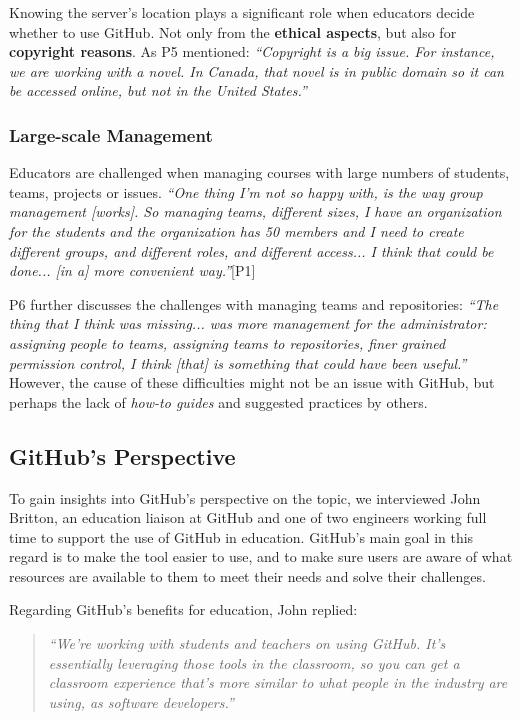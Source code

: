 Knowing the server's location plays a significant role when educators decide whether to use GitHub. Not only from the \textbf{ethical aspects}, but also for \textbf{copyright reasons}. As P5 mentioned: \textit{``Copyright is a big issue. For instance, we are working with a novel. In Canada, that novel is in public domain so it can be accessed online, but not in the United States.''}

\subsubsection{Large-scale Management}
Educators are challenged when managing courses with large numbers of students, teams, projects or issues. \textit{``One thing I'm not so happy with, is the way group management [works]. So managing teams, different sizes, I have an organization for the students and the organization has 50 members and I need to create different groups, and different roles, and different access... I think that could be done... [in a] more convenient way.''}[P1]

P6 further discusses the challenges with managing teams and repositories: \textit{``The thing that I think was missing... was more management for the administrator: assigning people to teams, assigning teams to repositories, finer grained permission control, I think [that] is something that could have been useful.''} However, the cause of these difficulties might not be an issue with GitHub, but perhaps the lack of \textit{how-to guides} and suggested practices by others.

\subsection{GitHub's Perspective}
To gain insights into GitHub's perspective on the topic, we interviewed John Britton, an education liaison at GitHub and one of two engineers working full time to support the use of GitHub in education. GitHub's main goal in this regard is to make the tool easier to use, and to make sure users are aware of what resources are available to them to meet their needs and solve their challenges. 

Regarding GitHub's benefits for education, John replied:
\begin{quote}\textit{``We're working with students and teachers on using GitHub. It's essentially leveraging those tools in the classroom, so you can get a classroom experience that's more similar to what people in the industry are using, as software developers.''}\end{quote}

